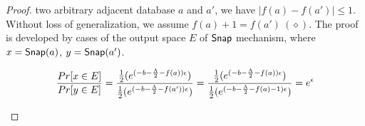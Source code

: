 \documentclass[a4paper,11pt]{article}
\begin{document}
\begin{proof}
%
%
%
%
%
two arbitrary adjacent database $a$ and $a'$, we have $|f(a) - f(a')| \leq 1$. Without loss of generalization, we assume $f(a) + 1 = f(a') ~ (\diamond)$. The proof is developed by cases of the output space $E$ of $\mathsf{Snap}$ mechanism, where $x = \mathsf{Snap}(a)$, $y = \mathsf{Snap}(a')$.

\begin{itemize}
	\[
	\frac{Pr[x \in E]}{Pr[y \in E]} 
	= \frac{\frac{1}{2}(
				e^{(-b -\frac{\Lambda}{2} - f(a))\epsilon})}
				{\frac{1}{2}(
				e^{(-b -\frac{\Lambda}{2} - f(a'))\epsilon})} \\
	= \frac{\frac{1}{2}(
				e^{(-b -\frac{\Lambda}{2} - f(a))\epsilon})}
				{\frac{1}{2}(
				e^{(-b -\frac{\Lambda}{2} - f(a) - 1)\epsilon})} \\
	= e^{\epsilon}
	\]


\end{itemize}
\end{proof}
\end{document}
